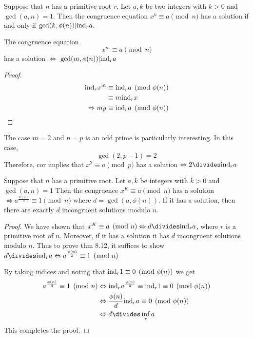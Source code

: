 \begin{corollary}
    Suppose that $n$ has a primitive root $r$,
    Let $a, k$ be two integers with $k > 0$ and $\gcd(a, n) = 1$.
    Then the congruence equation $x^k \equiv a \pmod n$ has a solution if and only if 
    $\gcd(k, \phi(n)) | \text{ind}_r a$.
\end{corollary}

\begin{corollary}
    The congruence equation
    \[
        x^m \equiv a \pmod n
    \]
    has a solution $\iff$ $\gcd(m, \phi(n)) | \text{ind}_r a$
\end{corollary}
\begin{proof}
    \[
        \begin{aligned}
            \text{ind}_r x^m &\equiv \text{ind}_r a \pmod{\phi(n)}\\
            &\equiv m \text{ind}_r x\\
            \Rightarrow my &\equiv \text{ind}_r a \pmod{\phi(n)}
        \end{aligned}
    \]
\end{proof}

\begin{remark}
    The case $m = 2$ and $n = p$ is an odd prime is particularly interesting.
    In this case,
    \[
        \gcd(2, p-1) = 2
    \]
    Therefore, cor implies that $x^2 \equiv a \pmod p$ has a solution
    $\iff 2 \divides \ind_r a$ 
\end{remark}

\begin{theorem}
    Suppose that $n$ has a primitive root.
    Let $a, k$ be integers with $k > 0$ and $\gcd(a, n) = 1$
    Then  the congruence $x^K \equiv a \pmod n$ has a solution $\iff a^{\frac{\phi(n)}{d}} \equiv 1 \pmod n$
    where $d = \gcd(a, \phi(n))$.
    If it has a solution, then there are exactly $d$ incongruent solutions modulo $n$.
\end{theorem}
\begin{proof}
    We have shown that $x^K \equiv a \pmod n \iff d \divides \ind_r a$,
    where $r$ is a primitive root of $n$.
    Moreover, if it has a solution it has $d$ incongruent solutions modulo $n$.
    Thus to prove thm 8.12, it suffices to show $d \divides \ind_r a \iff a^{\frac{\phi(n)}{d}} \equiv 1 \pmod n$

    By taking indices and noting that $\text{ind}_r 1 \equiv 0 \pmod {\phi(n)}$
    we get 
    \[
        \begin{aligned}
            a^{\frac{\phi(n)}{d}} \equiv 1 \pmod n &\iff \ind_r a^{\frac{\phi(n)}{d}} \equiv \ind_r 1 \equiv 0 \pmod {\phi(n)}\\
            &\iff \frac{\phi(n)}{d} \ind_r a \equiv 0 \pmod {\phi(n)}\\
            &\iff d \divides \inf_r a
        \end{aligned}
    \]
    This completes the proof.
\end{proof}

